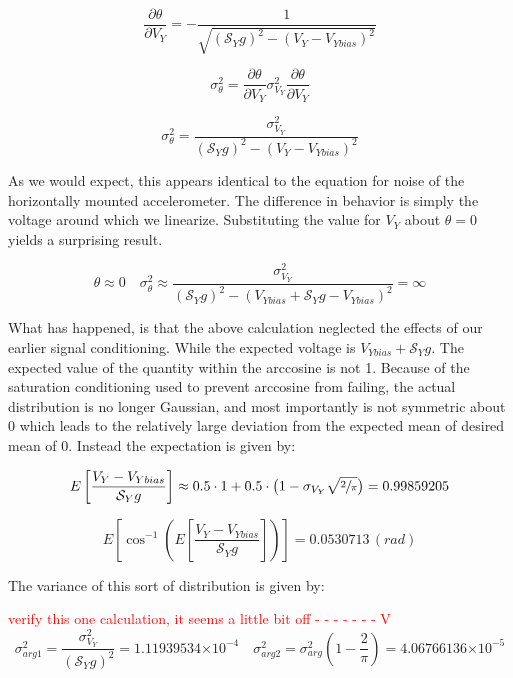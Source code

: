 \documentclass{article}
\newcommand{\xxx}[1]{\textcolor{red}{#1}}
\theoremstyle{plain}
\theoremstyle{definition}
\theoremstyle{remark}
\newcommand{\Sens}{\mathcal{S}}
\providecommand{\e}[1]{\ensuremath{\times 10^{#1}}}
\begin{document}
$$ \frac{\partial \theta}{\partial V_{Y}} = -\frac{1}{\sqrt{(\Sens_{Y} g)^2 - (V_{Y} - V_{Ybias})^2}}$$

$$ \sigma^2_{\theta} = \frac{\partial \theta}{\partial V_{Y}} \sigma^2_{V_{Y}} \frac{\partial \theta}{\partial V_{Y}} $$

$$ \sigma^2_{\theta} = \frac{\sigma^2_{V_{Y}}}{(\Sens_{Y} g)^2 - (V_{Y} - V_{Ybias})^2}$$

As we would expect, this appears identical to the equation for noise of the horizontally mounted accelerometer.  The difference in behavior is simply the voltage around which we linearize.  Substituting the value for $V_{Y}$ about $\theta = 0$  yields a surprising result.


$$ \theta \approx 0 \quad \sigma^2_{\theta} \approx \frac{\sigma^2_{V_{Y}}}{(\Sens_{Y} g)^2 - (V_{Ybias} + \Sens_{Y} g - V_{Ybias})^2} = \infty$$

What has happened, is that the above calculation neglected the effects of our earlier signal conditioning.  While the expected voltage is $V_{Ybias} + \Sens_Y g$.  The expected value of the quantity within the arccosine is not 1.  Because of the saturation conditioning used to prevent arccosine from failing, the actual distribution is no longer Gaussian, and most importantly is not symmetric about 0 which leads to the relatively large deviation from the expected mean of desired mean of 0.  Instead the expectation is given by:

$$ E \left[ \frac{V_{Y} - V_{Ybias}}{\Sens_{Y} g} \right] \approx 0.5 \cdot 1 + 0.5 \cdot \big(1 - \sigma_{V_Y} \sqrt{\sfrac{2}{\pi}} \big) = 0.99859205 $$

$$ E\left[ \cos^{-1} \left(  E \left[ \frac{V_{Y} - V_{Ybias}}{\Sens_{Y} g} \right]  \right)  \right] = 0.0530713 \, (rad) $$

The variance of this sort of distribution is given by: 

\xxx{verify this one calculation, it seems a little bit off - - - - - - -   V}
$$ \sigma_{arg1}^2 = \frac{\sigma^2_{V_Y}}{(\Sens_Y g)^2} = 1.11939534 \e{-4} \quad \sigma_{arg2}^2 = \sigma_{arg}^2 \left(1 - \frac{2}{\pi} \right) = 4.06766136 \e{-5}$$
\end{document}
